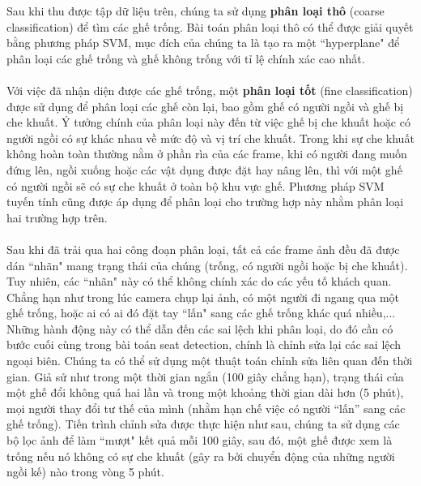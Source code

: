 \documentclass[12pt,a4paper]{article}
\begin{document}
\indent Sau khi thu được tập dữ liệu trên, chúng ta sử dụng \textbf{phân loại thô} (coarse classification) để tìm các ghế trống. Bài toán phân loại thô có thể được giải quyết bằng phương pháp SVM, mục đích của chúng ta là tạo ra một “hyperplane" để phân loại các ghế trống và ghế không trống với tỉ lệ chính xác cao nhất. \\ \\
\indent Với việc đã nhận diện được các ghế trống, một \textbf{phân loại tốt} (fine classification) được sử dụng để phân loại các ghế còn lại, bao gồm ghế có người ngồi và ghế bị che khuất. Ý tưởng chính của phân loại này đến từ việc ghế bị che khuất hoặc có người ngồi có sự khác nhau về mức độ và vị trí che khuất. Trong khi sự che khuất không hoàn toàn thường nằm ở phần rìa của các frame, khi có người đang muốn đứng lên, ngồi xuống hoặc các vật dụng được đặt hay nâng lên, thì với một ghế có người ngồi sẽ có sự che khuất ở toàn bộ khu vực ghế. Phương pháp SVM tuyến tính cũng được áp dụng để phân loại cho trường hợp này nhằm phân loại hai trường hợp trên. \\ \\
\indent Sau khi đã trải qua hai công đoạn phân loại, tất cả các frame ảnh đều đã được dán “nhãn" mang trạng thái của chúng (trống, có người ngồi hoặc bị che khuất). Tuy nhiên, các “nhãn" này có thể không chính xác do các yếu tố khách quan. Chẳng hạn như trong lúc camera chụp lại ảnh, có một người đi ngang qua một ghế trống, hoặc ai có ai đó đặt tay “lấn" sang các ghế trống khác quá nhiều,... Những hành động này có thể dẫn đến các sai lệch khi phân loại, do đó cần có bước cuối cùng trong bài toán seat detection, chính là chỉnh sửa lại các sai lệch ngoại biên. Chúng ta có thể sử dụng một thuật toán chỉnh sửa liên quan đến thời gian. Giả sử như trong một thời gian ngắn (100 giây chẳng hạn), trạng thái của một ghế đổi không quá hai lần và trong một khoảng thời gian dài hơn (5 phút), mọi người thay đổi tư thế của mình (nhằm hạn chế việc có người “lấn” sang các ghế trống). Tiến trình chỉnh sửa được thực hiện như sau, chúng ta sử dụng các bộ lọc ảnh để làm “mượt" kết quả mỗi 100 giây, sau đó, một ghế được xem là trống nếu nó không có sự che khuất (gây ra bởi chuyển động của những người ngồi kế) nào trong vòng 5 phút. \\ \\
\end{document}
